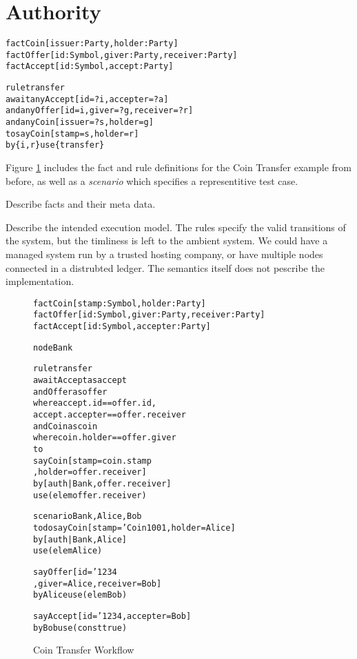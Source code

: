 
\clearpage{}
\section{Authority}

\begin{small}
\begin{alltt}
fact  Coin   [issuer: Party, holder: Party]
fact  Offer  [id: Symbol, giver: Party, receiver: Party]
fact  Accept [id: Symbol, accept: Party]

rule  transfer
await any Accept [id = ?i, accepter = ?a]
  and any Offer  [id = i,  giver = ?g, receiver = ?r]
  and any Coin   [issuer = ?s, holder = g]
to    say Coin   [stamp  = s,  holder = r]
      by  \{i, r\} use \{transfer\}
\end{alltt}
\end{small}


Figure \ref{f:CoinTransfer} includes the fact and rule definitions for the Coin Transfer example from before, as well as a \emph{scenario} which specifies a representitive test case.

Describe facts and their meta data.

Describe the intended execution model. The rules specify the valid transitions of the system, but the timliness is left to the ambient system. We could have a managed system run by a trusted hosting company, or have multiple nodes connected in a distrubted ledger. The semantics itself does not pescribe the implementation.


\begin{figure}
\begin{small}
\begin{alltt}
fact  Coin   [stamp: Symbol, holder: Party]
fact  Offer  [id: Symbol, giver: Party, receiver: Party]
fact  Accept [id: Symbol, accepter: Party]

node  Bank

rule  transfer
await Accept  as accept
 and  Offer   as offer
      where   accept.id       == offer.id,
              accept.accepter == offer.receiver
 and  Coin    as coin
      where   coin.holder     == offer.giver
to
      say Coin [ stamp  = coin.stamp
               , holder = offer.receiver]
      by  [auth| Bank, offer.receiver]
      use (elem offer.receiver)

scenario Bank, Alice, Bob
to do say Coin   [ stamp = 'Coin1001, holder = Alice]
      by  [auth| Bank, Alice]
      use (elem Alice)

      say Offer  [ id    = '1234
                 , giver = Alice, receiver = Bob]
      by  Alice use (elem Bob)

      say Accept [ id = '1234,    accepter = Bob]
      by  Bob   use (const true)
\end{alltt}
\end{small}

\caption{Coin Transfer Workflow}
\label{f:CoinTransfer}
\end{figure}
